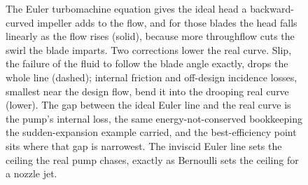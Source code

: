 \begin{figure}[htbp]
\centering
{}
\caption[Head-flow curve of a centrifugal pump]{The Euler turbomachine
equation gives the ideal head a backward-curved impeller adds to the
flow, and for those blades the head falls linearly as the flow rises
(solid), because more throughflow cuts the swirl the blade imparts.
Two corrections lower the real curve. Slip, the failure of the fluid to
follow the blade angle exactly, drops the whole line (dashed); internal
friction and off-design incidence losses, smallest near the design
flow, bend it into the drooping real curve (lower). The gap between the
ideal Euler line and the real curve is the pump's internal loss, the
same energy-not-conserved bookkeeping the sudden-expansion example
carried, and the best-efficiency point sits where that gap is
narrowest. The inviscid Euler line sets the ceiling the real pump
chases, exactly as Bernoulli sets the ceiling for a nozzle jet.}
\label{fig:vol03ch11:pump-head-flow}
\end{figure}
